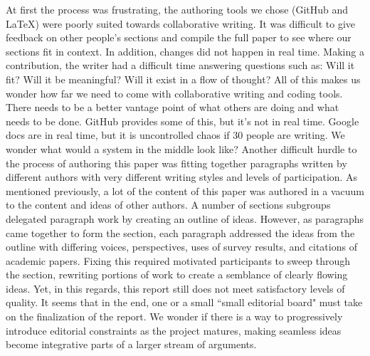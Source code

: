 \noindent At first the process was frustrating, the authoring tools we chose (GitHub and LaTeX) were poorly suited towards collaborative writing. It was difficult to give feedback on other people's sections and compile the full paper to see where our sections fit in context. In addition, changes did not happen in real time. Making a contribution, the writer had a difficult time answering questions such as: Will it fit? Will it be meaningful? Will it exist in a flow of thought? All of this makes us wonder how far we need to come with collaborative writing and coding tools. There needs to be a better vantage point of what others are doing and what needs to be done. GitHub provides some of this, but it's not in real time. Google docs are in real time, but it is uncontrolled chaos if 30 people are writing. We wonder what would a system in the middle look like?
Another difficult hurdle to the process of authoring this paper was fitting together paragraphs written by different authors with very different writing styles and levels of participation. As mentioned previously, a lot of the content of this paper was authored in a vacuum to the content and ideas of other authors. A number of sections subgroups delegated paragraph work by creating an outline of ideas. However, as paragraphs came together to form the section, each paragraph addressed the ideas from the outline with differing voices, perspectives, uses of survey results, and citations of academic papers. Fixing this required motivated participants to sweep through the section, rewriting portions of work to create a semblance of clearly flowing ideas. Yet, in this regards, this report still does not meet satisfactory levels of quality. It seems that in the end, one or a small ``small editorial board" must take on the finalization of the report. We wonder if there is a way to progressively introduce editorial constraints as the project matures, making seamless ideas become integrative parts of a larger stream of arguments.


